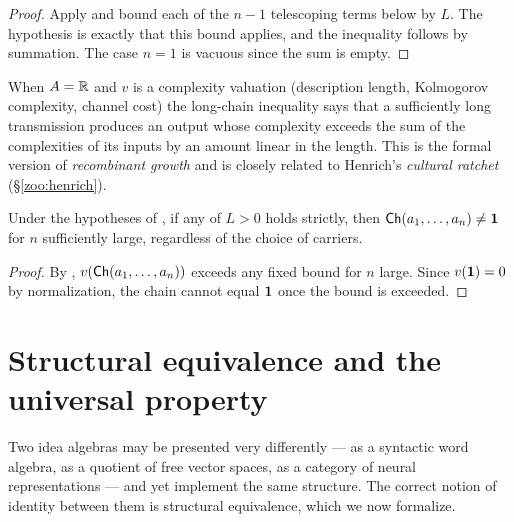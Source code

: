 \begin{proof}
Apply  and bound each of the $n-1$ telescoping
terms below by $L$. The hypothesis is exactly that this bound
applies, and the inequality follows by summation. The case $n=1$ is
vacuous since the sum is empty.
\end{proof}

\begin{remark}\label{rem:long-chain}
When $A=\mathbb{R}$ and $v$ is a complexity valuation (description length,
Kolmogorov complexity, channel cost) the long-chain inequality says
that a sufficiently long transmission produces an output whose
complexity exceeds the sum of the complexities of its inputs by an
amount linear in the length. This is the formal version of
\emph{recombinant growth} \cite{Weitzman1998} and is closely related
to Henrich's \emph{cultural ratchet} (\S\ref{zoo:henrich}).
\end{remark}

\begin{corollary}[No-collapse]\label{cor:no-collapse}
Under the hypotheses of , if any of $L>0$ holds
strictly, then $\mathsf{Ch}(a_1,\dots,a_n)\ne\mathbf{1}$ for $n$ sufficiently
large, regardless of the choice of carriers.
\end{corollary}

\begin{proof}
By , $v(\mathsf{Ch}(a_1,\dots,a_n))$ exceeds any fixed
bound for $n$ large. Since $v(\mathbf{1})=0$ by normalization, the chain
cannot equal $\mathbf{1}$ once the bound is exceeded.
\end{proof}

\section{Structural equivalence and the universal property}
\label{sec:struct-equiv}

Two idea algebras may be presented very differently --- as a syntactic
word algebra, as a quotient of free vector spaces, as a category of
neural representations --- and yet implement the same structure. The
correct notion of identity between them is structural equivalence,
which we now formalize.

